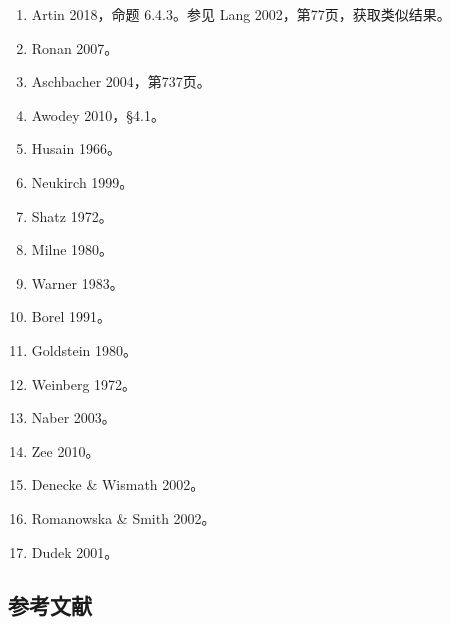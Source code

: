 \begin{enumerate}
\item Artin 2018，命题 6.4.3。参见 Lang 2002，第77页，获取类似结果。  
\item Ronan 2007。  
\item Aschbacher 2004，第737页。  
\item Awodey 2010，§4.1。  
\item Husain 1966。  
\item Neukirch 1999。  
\item Shatz 1972。  
\item Milne 1980。  
\item Warner 1983。  
\item Borel 1991。  
\item Goldstein 1980。  
\item Weinberg 1972。  
\item Naber 2003。  
\item Zee 2010。  
\item Denecke & Wismath 2002。  
\item Romanowska & Smith 2002。  
\item Dudek 2001。
\end{enumerate}
\subsection{参考文献}  
